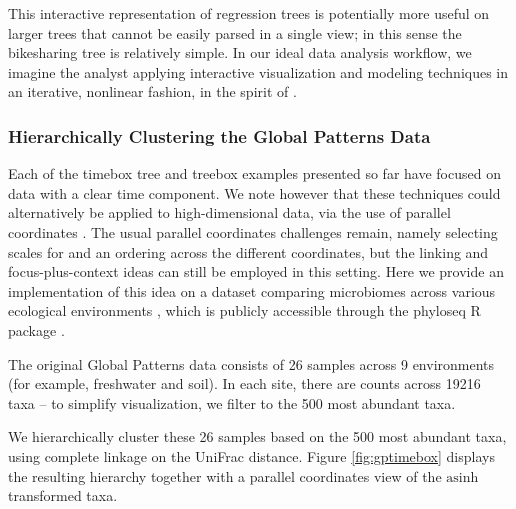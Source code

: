 This interactive representation of regression trees is potentially more
useful on larger trees that cannot be easily parsed in a single view; in
this sense the bikesharing tree is relatively simple. In our ideal data
analysis workflow, we imagine the analyst applying interactive
visualization and modeling techniques in an iterative, nonlinear
fashion, in the spirit of \citep{de2003visual}.

\subsubsection{Hierarchically Clustering the Global Patterns Data}\label{global_patterns}

Each of the timebox tree and treebox examples presented so far have
focused on data with a clear time component. We note however that these
techniques could alternatively be applied to high-dimensional data, via
the use of parallel coordinates \citep{inselberg1991parallel}. The usual
parallel coordinates challenges remain, namely selecting scales for and an
ordering across the different coordinates, but the linking and
focus-plus-context ideas can still be employed in this setting. Here we
provide an implementation of this idea on a dataset comparing microbiomes across
various ecological environments \citep{caporaso2011global}, which is publicly
accessible through the phyloseq R package \citep{mcmurdie2013phyloseq}.

The original Global Patterns data consists of 26 samples across 9
environments (for example, freshwater and soil). In each site, there are
counts across 19216 taxa -- to simplify visualization, we filter to the
500 most abundant taxa.

We hierarchically cluster these 26 samples based on the 500 most
abundant taxa, using complete linkage on the UniFrac distance. Figure
\ref{fig:gptimebox} displays the resulting hierarchy together with a
parallel coordinates view of the \(\text{asinh}\) transformed taxa.

